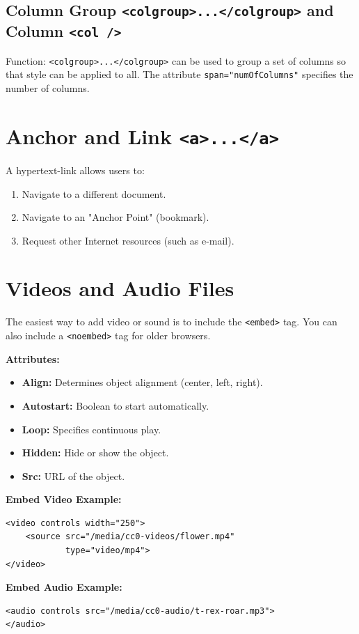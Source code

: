 \documentclass[12pt,a4paper]{article}
\begin{document}
\subsection*{Column Group \texttt{<colgroup>...</colgroup>} and Column \texttt{<col />}}
Function: \texttt{<colgroup>...</colgroup>} can be used to group a set of columns so that style can be applied to all. The attribute \texttt{span="numOfColumns"} specifies the number of columns.

\section*{Anchor and Link \texttt{<a>...</a>}}
A hypertext-link allows users to:
\begin{enumerate}
    \item Navigate to a different document.
    \item Navigate to an "Anchor Point" (bookmark).
    \item Request other Internet resources (such as e-mail).
\end{enumerate}

\section*{Videos and Audio Files}
The easiest way to add video or sound is to include the \texttt{<embed>} tag. You can also include a \texttt{<noembed>} tag for older browsers.

\textbf{Attributes:}
\begin{itemize}
    \item \textbf{Align:} Determines object alignment (center, left, right).
    \item \textbf{Autostart:} Boolean to start automatically.
    \item \textbf{Loop:} Specifies continuous play.
    \item \textbf{Hidden:} Hide or show the object.
    \item \textbf{Src:} URL of the object.
\end{itemize}

\textbf{Embed Video Example:}
\begin{verbatim}
<video controls width="250">
    <source src="/media/cc0-videos/flower.mp4"
            type="video/mp4">
</video>
\end{verbatim}

\textbf{Embed Audio Example:}
\begin{verbatim}
<audio controls src="/media/cc0-audio/t-rex-roar.mp3">
</audio>
\end{verbatim}
\end{document}
